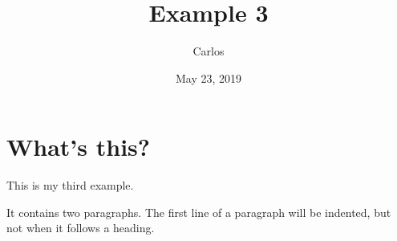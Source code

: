 \documentclass[a4paper,11pt]{article}
\begin{document}
\title{Example 3}
\author{Carlos}
\date{May 23, 2019}
\maketitle

\section{What's this?}
This is my third example.

It contains two paragraphs. The first line of a paragraph will be
indented, but not when it follows a heading.

\end{document}
